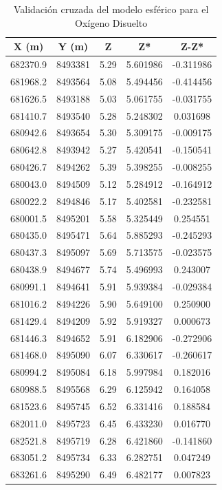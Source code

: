 \begin{table}[!htb]
\centering
\caption{Validación cruzada del modelo esférico para el Oxígeno Disuelto}
\label{tab:oxigeno_disuelto}
\begin{tabular}{ccccc}
\hline
X (m) & Y (m) & Z & Z* & Z-Z* \\ \hline
682370.9 & 8493381 & 5.29 & 5.601986 & -0.311986 \\
681968.2 & 8493564 & 5.08 & 5.494456 & -0.414456 \\
681626.5 & 8493188 & 5.03 & 5.061755 & -0.031755 \\
681410.7 & 8493540 & 5.28 & 5.248302 & 0.031698 \\
680942.6 & 8493654 & 5.30 & 5.309175 & -0.009175 \\
680642.8 & 8493942 & 5.27 & 5.420541 & -0.150541 \\
680426.7 & 8494262 & 5.39 & 5.398255 & -0.008255 \\
680043.0 & 8494509 & 5.12 & 5.284912 & -0.164912 \\
680022.2 & 8494846 & 5.17 & 5.402581 & -0.232581 \\
680001.5 & 8495201 & 5.58 & 5.325449 & 0.254551 \\
680435.0 & 8495471 & 5.64 & 5.885293 & -0.245293 \\
680437.3 & 8495097 & 5.69 & 5.713575 & -0.023575 \\
680438.9 & 8494677 & 5.74 & 5.496993 & 0.243007 \\
680991.1 & 8494641 & 5.91 & 5.939384 & -0.029384 \\
681016.2 & 8494226 & 5.90 & 5.649100 & 0.250900 \\
681429.4 & 8494209 & 5.92 & 5.919327 & 0.000673 \\
681446.3 & 8494652 & 5.91 & 6.182906 & -0.272906 \\
681468.0 & 8495090 & 6.07 & 6.330617 & -0.260617 \\
680994.2 & 8495084 & 6.18 & 5.997984 & 0.182016 \\
680988.5 & 8495568 & 6.29 & 6.125942 & 0.164058 \\
681523.6 & 8495745 & 6.52 & 6.331416 & 0.188584 \\
682011.0 & 8495723 & 6.45 & 6.433230 & 0.016770 \\
682521.8 & 8495719 & 6.28 & 6.421860 & -0.141860 \\
683051.2 & 8495734 & 6.33 & 6.282751 & 0.047249 \\
683261.6 & 8495290 & 6.49 & 6.482177 & 0.007823 \\

\end{tabular}
\end{table}
